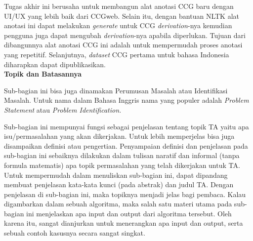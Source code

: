 Tugas akhir ini berusaha untuk membangun alat anotasi CCG baru dengan
UI/UX yang lebih baik dari CCGweb.
Selain itu, dengan bantuan NLTK alat anotasi ini dapat melakukan \textit{generate} untuk
CCG \textit{derivation}-nya kemudian pengguna juga dapat mengubah \textit{derivation}-nya
apabila diperlukan.
Tujuan dari dibangunnya alat anotasi CCG ini adalah untuk mempermudah proses anotasi yang
repetitif.
Selanjutnya, \textit{dataset} CCG pertama untuk bahasa Indonesia diharapkan dapat dipublikasikan.
\\


\noindent\textbf{Topik dan Batasannya}

Sub-bagian ini bisa juga dinamakan Perumusan Masalah atau Identifikasi Masalah. Untuk nama dalam Bahasa Inggris nama yang populer adalah \textit{Problem Statement} atau \textit{Problem Identification.}

Sub-bagian ini mempunyai fungsi sebagai penjelasan tentang topik TA yaitu apa isu/permasalahan yang akan dikerjakan. Untuk lebih memperjelas bisa juga disampaikan definisi atau pengertian. Penyampaian definisi dan penjelasan pada sub-bagian ini sebaiknya dilakukan dalam tulisan naratif dan informal (tanpa formula matematis) apa topik permasalahan yang telah dikerjakan untuk TA. Untuk mempermudah dalam menuliskan sub-bagian ini, dapat dipandang membuat penjelasan kata-kata kunci (pada abstrak) dan judul TA. Dengan penjelasan di sub-bagian ini, maka topiknya menjadi jelas bagi pembaca. Kalau digambarkan dalam sebuah algoritma, maka salah satu materi utama pada sub-bagian ini menjelaskan apa input dan output dari algoritma tersebut. Oleh karena itu, sangat dianjurkan untuk menerangkan apa input dan output, serta sebuah contoh kasusnya secara sangat singkat.

